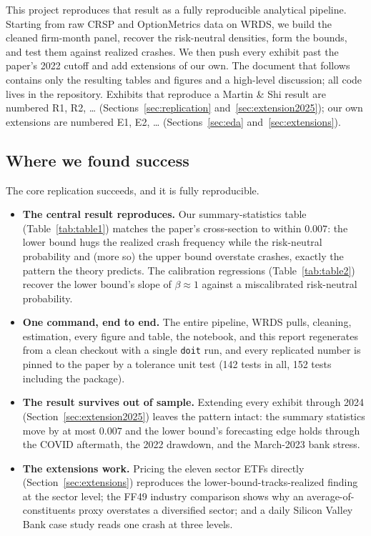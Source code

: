 \documentclass[12pt]{article}
\begin{document}
This project reproduces that result as a fully reproducible analytical pipeline.
Starting from raw CRSP and OptionMetrics data on WRDS, we build the cleaned
firm-month panel, recover the risk-neutral densities, form the bounds, and test
them against realized crashes. We then push every exhibit past the paper's 2022
cutoff and add extensions of our own. The document that follows contains only the
resulting tables and figures and a high-level discussion; all code lives in the
repository. Exhibits that reproduce a Martin \& Shi result are numbered R1, R2,
\ldots{} (Sections~\ref{sec:replication} and~\ref{sec:extension2025}); our own
extensions are numbered E1, E2, \ldots{} (Sections~\ref{sec:eda}
and~\ref{sec:extensions}).

\subsection{Where we found success}
The core replication succeeds, and it is fully reproducible.
\begin{itemize}
  \item \textbf{The central result reproduces.} Our summary-statistics table
    (Table~\ref{tab:table1}) matches the paper's cross-section to within $0.007$:
    the lower bound hugs the realized crash frequency while the risk-neutral
    probability and (more so) the upper bound overstate crashes, exactly the
    pattern the theory predicts. The calibration regressions
    (Table~\ref{tab:table2}) recover the lower bound's slope of $\beta \approx 1$
    against a miscalibrated risk-neutral probability.
  \item \textbf{One command, end to end.} The entire pipeline, WRDS pulls,
    cleaning, estimation, every figure and table, the notebook, and this report
    regenerates from a clean checkout with a single \texttt{doit} run, and every
    replicated number is pinned to the paper by a tolerance unit test (142 tests in
    all, 152 tests including the package).
  \item \textbf{The result survives out of sample.} Extending every exhibit through
    2024 (Section~\ref{sec:extension2025}) leaves the pattern intact: the
    summary statistics move by at most $0.007$ and the lower bound's forecasting
    edge holds through the COVID aftermath, the 2022 drawdown, and the March-2023
    bank stress.
  \item \textbf{The extensions work.} Pricing the eleven sector ETFs directly
    (Section~\ref{sec:extensions}) reproduces the lower-bound-tracks-realized
    finding at the sector level; the FF49 industry comparison shows why an
    average-of-constituents proxy overstates a diversified sector; and a daily
    Silicon Valley Bank case study reads one crash at three levels.
\end{itemize}
\end{document}
